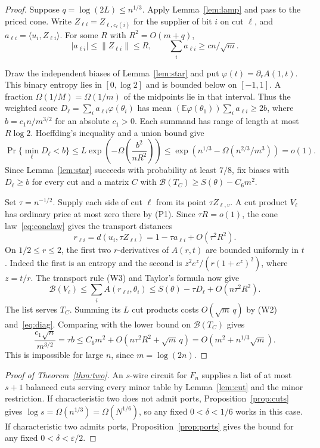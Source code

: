 \documentclass[11pt]{article}
\theoremstyle{remark}
\newcommand{\E}{\mathbb E}
\newcommand{\price}{\mathcal B}
\newcommand{\ip}[2]{\langle #1,#2\rangle}
\newcommand{\norm}[1]{\lVert #1\rVert}
\begin{document}
\begin{proof}
Suppose \(q=\log(2L)\le n^{1/3}\). Apply Lemma~\ref{lem:lamp} and pass to
the priced cone. Write \(Z_{\ell i}=Z_{\ell,c_\ell(i)}\) for the supplier
of bit \(i\) on cut \(\ell\), and \(a_{\ell i}=\ip{u_i}{Z_{\ell i}}\).
For some \(R\) with \(R^2=O(m+q)\),
\[
 |a_{\ell i}|\le\norm{Z_{\ell i}}\le R,\qquad
 \sum_i a_{\ell i}\ge c n/\sqrt m .
\]

Draw the independent biases of Lemma~\ref{lem:star} and put
\(\varphi(t)=\partial_r A(1,t)\). This binary entropy lies in
\([0,\log 2]\) and is bounded below on \([-1,1]\). A fraction
\(\Omega(1/M)=\Omega(1/m)\) of the midpoints lie in that interval.
Thus the weighted score \(D_\ell=\sum_i a_{\ell i}\varphi(\theta_i)\)
has mean \((\E\varphi(\theta_1))\sum_i a_{\ell i}\ge 2b\), where
\(b=c_1 n/m^{3/2}\) for an absolute \(c_1>0\). Each summand has range
of length at most \(R\log 2\). Hoeffding's inequality and a union bound give
\[
 \Pr\{\min_\ell D_\ell<b\}
 \le L\exp\!\left(-\Omega\!\left(\frac{b^2}{nR^2}\right)\right)
 \le \exp\!\left(n^{1/3}-\Omega(n^{2/3}/m^3)\right)=o(1).
\]
Since Lemma~\ref{lem:star} succeeds with probability at least \(7/8\),
fix biases with \(D_\ell\ge b\) for every cut and a matrix \(C\) with
\(\price(T_C)\ge S(\theta)-C_6m^2\).

Set \(\tau=n^{-1/2}\). Supply each side of cut \(\ell\) from its point
\(\tau Z_{\ell,v}\). A cut product \(V_\ell\) has ordinary price at most
zero there by (P1). Since \(\tau R=o(1)\), the cone law~\eqref{eq:conelaw}
gives the transport distances
\begin{equation}\label{eq:two-distance}
 r_{\ell i}=d(u_i,\tau Z_{\ell i})
     =1-\tau a_{\ell i}+O(\tau^2R^2).
\end{equation}
On \(1/2\le r\le2\), the first two \(r\)-derivatives of \(A(r,t)\)
are bounded uniformly in \(t\). Indeed the first is an entropy and the
second is \(z^2e^z/(r(1+e^z)^2)\), where \(z=t/r\).
The transport rule (W3) and Taylor's formula now give
\[
 \price(V_\ell)\le\sum_i A(r_{\ell i},\theta_i)
       \le S(\theta)-\tau D_\ell+O(n\tau^2R^2).
\]
The list serves \(T_C\). Summing its \(L\) cut products costs
\(O(\sqrt m\,q)\) by (W2) and~\eqref{eq:diag}. Comparing with the
lower bound on \(\price(T_C)\) gives
\[
 \frac{c_1\sqrt n}{m^{3/2}}=\tau b
   \le C_6m^2+O(n\tau^2R^2+\sqrt m\,q)
   =O(m^2+n^{1/3}\sqrt m).
\]
This is impossible for large \(n\), since \(m=\log(2n)\).
\end{proof}

\begin{proof}[Proof of Theorem~\ref{thm:two}]
An \(s\)-wire circuit for \(F_n\) supplies a list of at most \(s+1\)
balanced cuts serving every minor table by Lemma~\ref{lem:cut} and the
minor restriction. If characteristic two does not admit ports,
Proposition~\ref{prop:cuts} gives \(\log s=\Omega(n^{1/3})
=\Omega(N^{1/6})\), so any fixed \(0<\delta<1/6\) works in this case.
If characteristic two admits ports, Proposition~\ref{prop:ports} gives
the bound for any fixed \(0<\delta<\varepsilon/2\).
\end{proof}
\end{document}
